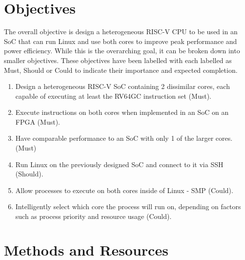 \documentclass[a4paper,fleqn,11pt]{article}
\begin{document}
\section{Objectives}
The overall objective is design a heterogeneous RISC-V CPU to be used in an SoC that can run Linux and use both cores to improve peak performance and power efficiency. While this is the overarching goal, it can be broken down into smaller objectives. These objectives have been labelled with each labelled as Must, Should or Could to indicate their importance and expected completion.
\begin{enumerate}
    \item Design a heterogeneous RISC-V SoC containing 2 dissimilar cores, each capable of executing at least the RV64GC instruction set (Must).
    \item Execute instructions on both cores when implemented in an SoC on an FPGA (Must).
    \item Have comparable performance to an SoC with only 1 of the larger cores. (Must)
    \item Run Linux on the previously designed SoC and connect to it via SSH (Should).
    \item Allow processes to execute on both cores inside of Linux - SMP (Could).
    \item Intelligently select which core the process will run on, depending on factors such as process priority and resource usage (Could).
\end{enumerate}

\section{Methods and Resources}


\clearpage
\end{document}
